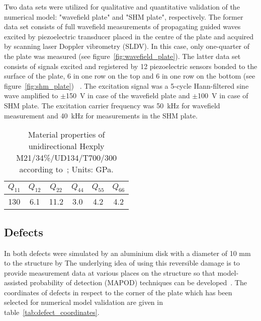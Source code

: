 Two data sets were utilized for qualitative and quantitative validation of the numerical model: "wavefield plate" and "SHM plate", respectively. The former data set consists of full wavefield measurements of propagating guided waves excited by piezoelectric transducer placed in the centre of the plate and acquired by scanning laser Doppler vibrometry (SLDV). In this case, only one-quarter of the plate was measured (see figure~\ref{fig:wavefield_plate}). The latter data set consists of signals excited and registered by 12 piezoelectric sensors bonded to the surface of the plate, 6 in one row on the top and 6 in one row on the bottom (see figure~\ref{fig:shm_plate})~ \cite{Moll2018}. The excitation signal was a 5-cycle Hann-filtered sine wave amplified to \(\pm\)150~V in case of the wavefield plate and  \(\pm\)100~V in case of SHM plate. The excitation carrier frequency was 50~kHz for wavefield measurement and 40~kHz for measurements in the SHM plate.

\begin{table}
\caption{Material properties of unidirectional Hexply M21/34\%/UD134/T700/300 according to~\cite{Moll2018}; Units: GPa.}
	
	\begin{indented}
	\item[]	\begin{tabular}{cccccc} 
		\toprule
		\(Q_{11}\) & \(Q_{12}\)  & \(Q_{22}\) & \(Q_{44}\) & \(Q_{55}\) & \(Q_{66}\)\\	
		\midrule
		130& 6.1& 11.2 & 3.0 & 4.2 & 4.2\\
		\bottomrule 
	\end{tabular} 
	\label{tab:mat_prop}
	\end{indented}
\end{table}

\begin{figure} [h!]
	\centering
		\hspace{5mm}
\caption{}
	\label{fig:plate_arrangement}
\end{figure}

\subsection{Defects}
In both   defects were simulated by an aluminium disk with a diameter of 10 mm   to the structure by   The underlying idea of using this reversible damage is to provide measurement data at various places on the structure so that model-assisted probability of detection (MAPOD) techniques can be developed~\cite{Eckstein2012}. The coordinates of defects in respect to the   corner of the plate which has been selected for numerical model validation are given in table~\ref{tab:defect_coordinates}.

